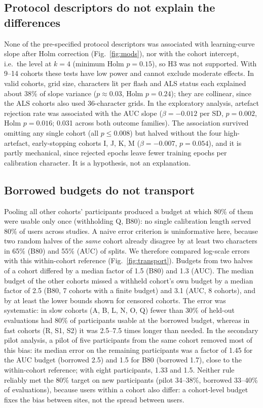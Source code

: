 \documentclass[conference]{IEEEtran}
\begin{document}
\subsection{Protocol descriptors do not explain the differences}
None of the pre-specified protocol descriptors was associated with learning-curve slope after Holm correction (Fig.~\ref{fig:mods}), nor with the cohort intercept, i.e.\ the level at $k=4$ (minimum Holm $p=0.15$), so H3 was not supported. With 9--14 cohorts these tests have low power and cannot exclude moderate effects. In valid cohorts, grid size, characters lit per flash and ALS status each explained about 38\% of slope variance ($p\approx0.03$, Holm $p=0.24$); they are collinear, since the ALS cohorts also used 36-character grids. In the exploratory analysis, artefact rejection rate was associated with the AUC slope ($\beta=-0.012$ per SD, $p=0.002$, Holm $p=0.016$; 0.031 across both outcome families). The association survived omitting any single cohort (all $p\leq0.008$) but halved without the four high-artefact, early-stopping cohorts I, J, K, M ($\beta=-0.007$, $p=0.054$), and it is partly mechanical, since rejected epochs leave fewer training epochs per calibration character. It is a hypothesis, not an explanation.

\subsection{Borrowed budgets do not transport}
Pooling all other cohorts' participants produced a budget at which 80\% of them were usable only once (withholding Q, B80): no single calibration length served 80\% of users across studies. A naive error criterion is uninformative here, because two random halves of the \emph{same} cohort already disagree by at least two characters in 65\% (B80) and 55\% (AUC) of splits. We therefore compared log-scale errors with this within-cohort reference (Fig.~\ref{fig:transport}). Budgets from two halves of a cohort differed by a median factor of 1.5 (B80) and 1.3 (AUC). The median budget of the other cohorts missed a withheld cohort's own budget by a median factor of 2.5 (B80, 7 cohorts with a finite budget) and 3.1 (AUC, 8 cohorts), and by at least the lower bounds shown for censored cohorts. The error was systematic: in slow cohorts (A, B, L, N, O, Q) fewer than 30\% of held-out evaluations had 80\% of participants usable at the borrowed budget, whereas in fast cohorts (R, S1, S2) it was 2.5--7.5 times longer than needed. In the secondary pilot analysis, a pilot of five participants from the same cohort removed most of this bias: its median error on the remaining participants was a factor of 1.45 for the AUC budget (borrowed 2.5) and 1.5 for B80 (borrowed 1.7), close to the within-cohort reference; with eight participants, 1.33 and 1.5. Neither rule reliably met the 80\% target on new participants (pilot 34--38\%, borrowed 33--40\% of evaluations), because users within a cohort also differ: a cohort-level budget fixes the bias between sites, not the spread between users.
\end{document}
